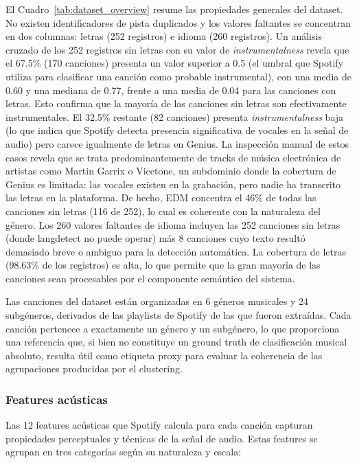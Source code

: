 

El Cuadro~\ref{tab:dataset_overview} resume las propiedades generales del dataset. No existen identificadores de pista duplicados y los valores faltantes se concentran en dos columnas: letras (252 registros) e idioma (260 registros). Un análisis cruzado de los 252 registros sin letras con su valor de \textit{instrumentalness} revela que el 67.5\% (170 canciones) presenta un valor superior a 0.5 (el umbral que Spotify utiliza para clasificar una canción como probable instrumental), con una media de 0.60 y una mediana de 0.77, frente a una media de 0.04 para las canciones con letras. Esto confirma que la mayoría de las canciones sin letras son efectivamente instrumentales. El 32.5\% restante (82 canciones) presenta \textit{instrumentalness} baja (lo que indica que Spotify detecta presencia significativa de vocales en la señal de audio) pero carece igualmente de letras en Genius. La inspección manual de estos casos revela que se trata predominantemente de tracks de música electrónica de artistas como Martin Garrix o Vicetone, un subdominio donde la cobertura de Genius es limitada: las vocales existen en la grabación, pero nadie ha transcrito las letras en la plataforma. De hecho, EDM concentra el 46\% de todas las canciones sin letras (116 de 252), lo cual es coherente con la naturaleza del género. Los 260 valores faltantes de idioma incluyen las 252 canciones sin letras (donde langdetect no puede operar) más 8 canciones cuyo texto resultó demasiado breve o ambiguo para la detección automática. La cobertura de letras (98.63\% de los registros) es alta, lo que permite que la gran mayoría de las canciones sean procesables por el componente semántico del sistema.

Las canciones del dataset están organizadas en 6 géneros musicales y 24 subgéneros, derivados de las playlists de Spotify de las que fueron extraídas. Cada canción pertenece a exactamente un género y un subgénero, lo que proporciona una referencia que, si bien no constituye un ground truth de clasificación musical absoluto, resulta útil como etiqueta proxy para evaluar la coherencia de las agrupaciones producidas por el clustering.


\subsubsection*{Features acústicas}

Las 12 features acústicas que Spotify calcula para cada canción capturan propiedades perceptuales y técnicas de la señal de audio. Estas features se agrupan en tres categorías según su naturaleza y escala:

